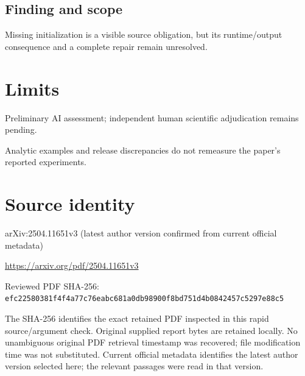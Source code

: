 \documentclass[11pt]{article}
\begin{document}
\subsection*{Finding and scope}

Missing initialization is a visible source obligation, but its runtime/output consequence and a complete repair remain unresolved.

\section*{Limits}

Preliminary AI assessment; independent human scientific adjudication remains pending.\par

Analytic examples and release discrepancies do not remeasure the paper’s reported experiments.\par

\section*{Source identity}

arXiv:2504.11651v3 (latest author version confirmed from current official metadata)

\url{https://arxiv.org/pdf/2504.11651v3}

Reviewed PDF SHA-256: \nolinkurl{efc22580381f4f4a77c76eabc681a0db98900f8bd751d4b0842457c5297e88c5}

The SHA-256 identifies the exact retained PDF inspected in this rapid source/argument check. Original supplied report bytes are retained locally. No unambiguous original PDF retrieval timestamp was recovered; file modification time was not substituted. Current official metadata identifies the latest author version selected here; the relevant passages were read in that version.
\end{document}
